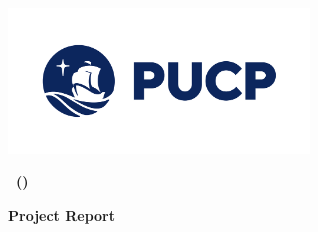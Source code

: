 \begin{titlepage}
    \centering
    \vspace*{0.5cm}
    {\Huge\bfseries \college \par}
    \vspace{1cm}
    {\Large\bfseries \faculty \par}
    \vspace{1cm}
    \includegraphics[width=0.6\textwidth]{images/pucp}
    \vspace{2cm}

    {\Large\bfseries \courseTitle\ (\courseCode) \par}
    \vspace{1.5cm}
    {\large\bfseries Project Report \par}
    \vspace{2cm}
    \authors
    \vspace{2cm}

    {\large \noteDate \par}
    \vfill
\end{titlepage}